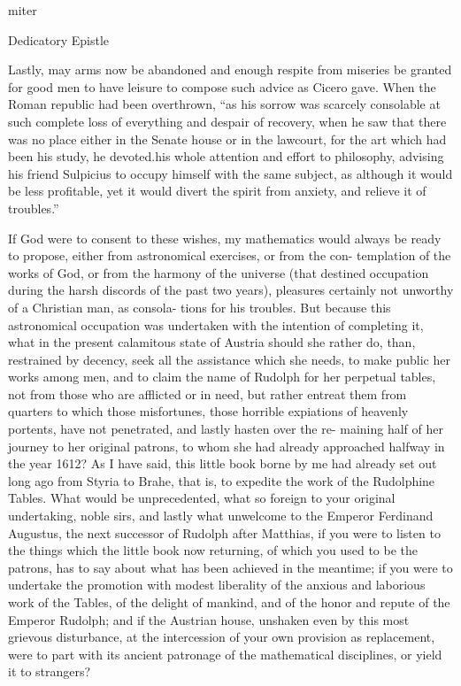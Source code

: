 \documentclass{article}
\begin{document}
{{miter


Dedicatory Epistle

Lastly, may arms now be abandoned and enough respite from miseries
be granted for good men to have leisure to compose such advice as
Cicero gave. When the Roman republic had been overthrown, “as his
sorrow was scarcely consolable at such complete loss of everything and
despair of recovery, when he saw that there was no place either in the
Senate house or in the lawcourt, for the art which had been his study, he
devoted.his whole attention and effort to philosophy, advising his friend
Sulpicius to occupy himself with the same subject, as although it would
be less profitable, yet it would divert the spirit from anxiety, and relieve
it of troubles.”

If God were to consent to these wishes, my mathematics would always
be ready to propose, either from astronomical exercises, or from the con-
templation of the works of God, or from the harmony of the universe
(that destined occupation during the harsh discords of the past two
years), pleasures certainly not unworthy of a Christian man, as consola-
tions for his troubles. But because this astronomical occupation was
undertaken with the intention of completing it, what in the present
calamitous state of Austria should she rather do, than, restrained by
decency, seek all the assistance which she needs, to make public her
works among men, and to claim the name of Rudolph for her perpetual
tables, not from those who are afflicted or in need, but rather entreat
them from quarters to which those misfortunes, those horrible expiations
of heavenly portents, have not penetrated, and lastly hasten over the re-
maining half of her journey to her original patrons, to whom she had
already approached halfway in the year 1612? As I have said, this little
book borne by me had already set out long ago from Styria to Brahe,
that is, to expedite the work of the Rudolphine Tables. What would be
unprecedented, what so foreign to your original undertaking, noble sirs,
and lastly what unwelcome to the Emperor Ferdinand Augustus, the next
successor of Rudolph after Matthias, if you were to listen to the things
which the little book now returning, of which you used to be the patrons,
has to say about what has been achieved in the meantime; if you were to
undertake the promotion with modest liberality of the anxious and
laborious work of the Tables, of the delight of mankind, and of the
honor and repute of the Emperor Rudolph; and if the Austrian house,
unshaken even by this most grievous disturbance, at the intercession of
your own provision as replacement, were to part with its ancient
patronage of the mathematical disciplines, or yield it to strangers?

}}
\end{document}
